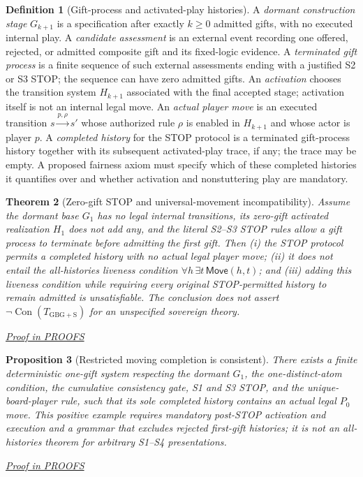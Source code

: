 \documentclass[11pt,letterpaper]{article}
\newtheorem{theorem}{Theorem}[section]
\newtheorem{proposition}[theorem]{Proposition}
\theoremstyle{definition}\newtheorem{definition}[theorem]{Definition}\newtheorem{example}[theorem]{Example}
\theoremstyle{remark}\newtheorem{remark}[theorem]{Remark}
\newcommand{\Con}{\operatorname{Con}}
\newcommand{\prooflink}[1]{\par\noindent\hfill\small\hyperref[#1]{\textit{Proof in PROOFS}}\normalsize}
\begin{document}
\begin{definition}[Gift-process and activated-play histories]\label{br:def:lifecycle}
A \emph{dormant construction stage} $G_{k+1}$ is a specification after exactly
$k\ge0$ admitted gifts, with no executed internal play. A \emph{candidate
assessment} is an external event recording one offered, rejected, or admitted
composite gift and its fixed-logic evidence. A \emph{terminated gift process}
is a finite sequence of such external assessments ending with a justified S2
or S3 STOP; the sequence can have zero admitted gifts. An \emph{activation}
chooses the transition system $H_{k+1}$ associated with the final accepted
stage; activation itself is not an internal legal move. An \emph{actual player
move} is an executed transition $s\xrightarrow{p,\rho}s'$ whose authorized
rule $\rho$ is enabled in $H_{k+1}$ and whose actor is player $p$. A
\emph{completed history} for the STOP protocol is a terminated gift-process
history together with its subsequent activated-play trace, if any; the trace
may be empty. A proposed fairness axiom must specify which of these completed
histories it quantifies over and whether activation and nonstuttering play
are mandatory.
\end{definition}

\begin{theorem}[Zero-gift STOP and universal-movement incompatibility]\label{br:th:stop-liveness}
Assume the dormant base $G_1$ has no legal internal transitions, its zero-gift
activated realization $H_1$ does not add any, and the literal S2--S3 STOP
rules allow a gift process to terminate before admitting the first gift.
Then (i) the STOP protocol permits a completed history with no actual legal
player move; (ii) it does not entail the all-histories liveness condition
$\forall h\,\exists t\,\mathsf{Move}(h,t)$; and (iii) adding this liveness
condition while requiring \emph{every} original STOP-permitted history to
remain admitted is unsatisfiable. The conclusion does not assert
$\neg\Con(T_{\mathrm{GBG+S}})$ for an unspecified sovereign theory.
\prooflink{br:pr:stop-liveness}
\end{theorem}

\begin{proposition}[Restricted moving completion is consistent]\label{br:prop:moving-completion}
There exists a finite deterministic one-gift system respecting the dormant
$G_1$, the one-distinct-atom condition, the cumulative consistency gate,
S1 and S3 STOP, and the unique-board-player rule, such that its sole
completed history contains an actual legal $P_0$ move. This positive
example requires mandatory post-STOP activation and execution and a
grammar that excludes rejected first-gift histories; it is not an
all-histories theorem for arbitrary S1--S4 presentations.
\prooflink{br:pr:moving-completion}
\end{proposition}
\end{document}
